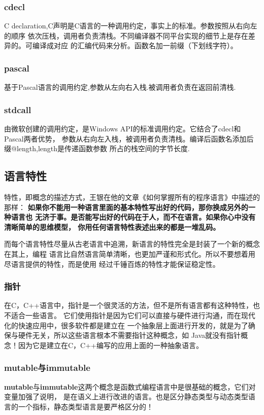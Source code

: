 \subsubsection{cdecl}
C declaration,C声明是C语言的一种调用约定，事实上的标准。参数按照从右向左的顺序
依次压栈，调用者负责清栈。不同编译器不同平台实现的细节上是存在差异的。可编译成对应
的汇编代码来分析。函数名加一前缀（下划线字符）。

\subsubsection{pascal}
基于Pascal语言的调用约定,参数从左向右入栈.被调用者负责在返回前清栈.

\subsubsection{stdcall}
由微软创建的调用约定，是Windows API的标准调用约定。它结合了cdecl和Pascal两者优势，
参数从右向左入栈，被调用者负责清栈。编译后函数名添加后缀@length,length是传递函数参数
所占的栈空间的字节长度.

\subsection{语言特性}
特性，即概念的描述方式，王银在他的文章《如何掌握所有的程序语言》中描述的那样：
\textbf{如果你不能用一种语言里面的基本特性写出好的代码，那你换成另外的一种语言也
无济于事。是否能写出好的代码在于人，而不在语言。如果你心中没有清晰简单的思维模型，
你用任何语言特性表述出来的都是一堆乱码。}

而每个语言特性尽量从古老语言中追溯，新语言的特性完全是封装了一个新的概念在其上，编程
语言比自然语言简单清晰，也更加严谨和形式化。所以不要想着用尽语言提供的特性，而是使用
经过千锤百炼的特性才能保证稳定性。

\subsubsection{指针}
在C，C++语言中，指针是一个很灵活的方法，但不是所有语言都有这种特性，也不适合一些语言。
它们使用指针是因为它们可以直接与硬件进行沟通，而在现代化的快速应用中，很多软件都是建立在
一个抽象层上面进行开发的，就是为了确保与硬件无关，所以这些语言根本不需要指针这种概念，如
Java就没有指针概念！因为它是建立在C，C++编写的应用上面的一种抽象语言。

\subsubsection{mutable与immutable}
\textbf{mutable}与\textbf{immutable}这两个概念是函数式编程语言中是很基础的概念，它们对变量加强了说明，
是在语义上进行改进的语言。也是区分静态类型与动态类型语言的一个指标，静态类型语言是要严格区分的！

